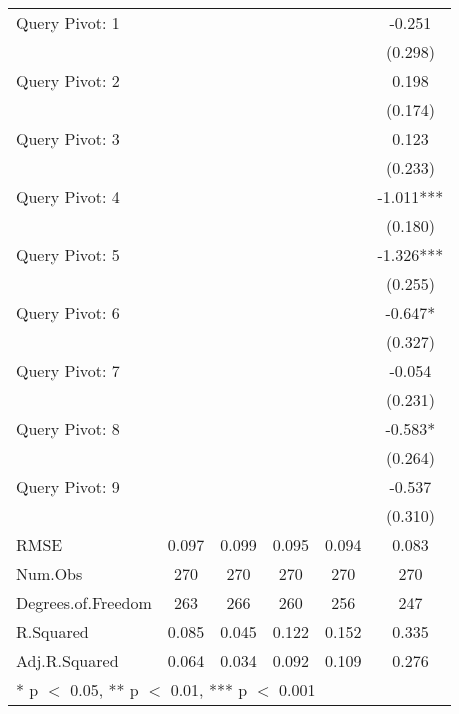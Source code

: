 \begin{table}
\begin{tabular}[t]{lccccc}
Query Pivot: 1 &  &  &  &  & -0.251\\
 &  &  &  &  & (0.298)\\
Query Pivot: 2 &  &  &  &  & 0.198\\
 &  &  &  &  & (0.174)\\
Query Pivot: 3 &  &  &  &  & 0.123\\
 &  &  &  &  & (0.233)\\
Query Pivot: 4 &  &  &  &  & -1.011***\\
 &  &  &  &  & (0.180)\\
Query Pivot: 5 &  &  &  &  & -1.326***\\
 &  &  &  &  & (0.255)\\
Query Pivot: 6 &  &  &  &  & -0.647*\\
 &  &  &  &  & (0.327)\\
Query Pivot: 7 &  &  &  &  & -0.054\\
 &  &  &  &  & (0.231)\\
Query Pivot: 8 &  &  &  &  & -0.583*\\
 &  &  &  &  & (0.264)\\
Query Pivot: 9 &  &  &  &  & -0.537\\
 &  &  &  &  & (0.310)\\
\midrule
RMSE & 0.097 & 0.099 & 0.095 & 0.094 & 0.083\\
Num.Obs & 270 & 270 & 270 & 270 & 270\\
Degrees.of.Freedom & 263 & 266 & 260 & 256 & 247\\
R.Squared & 0.085 & 0.045 & 0.122 & 0.152 & 0.335\\
Adj.R.Squared & 0.064 & 0.034 & 0.092 & 0.109 & 0.276\\
\bottomrule
\multicolumn{6}{l}{\rule{0pt}{1em}* p $<$ 0.05, ** p $<$ 0.01, *** p $<$ 0.001}\\
\end{tabular}
\end{table}
